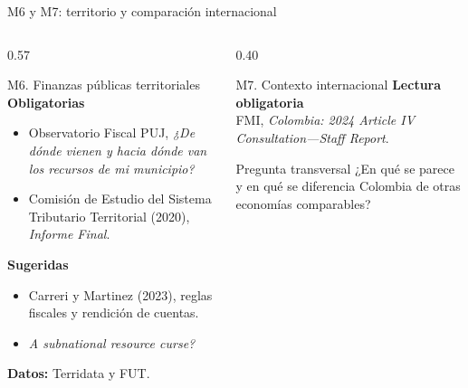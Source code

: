 \begin{frame}{M6 y M7: territorio y comparaci\'on internacional}
\scriptsize
\begin{columns}[T,onlytextwidth]
  \begin{column}{0.57\textwidth}
    \begin{block}{M6. Finanzas p\'ublicas territoriales}
      \textbf{Obligatorias}
      \begin{itemize}
        \item Observatorio Fiscal PUJ, \textit{¿De d\'onde vienen y hacia d\'onde van los recursos de mi municipio?}
        \item Comisi\'on de Estudio del Sistema Tributario Territorial (2020), \textit{Informe Final}.
      \end{itemize}
      \textbf{Sugeridas}
      \begin{itemize}
        \item Carreri y Martinez (2023), reglas fiscales y rendici\'on de cuentas.
        \item \textit{A subnational resource curse?}
      \end{itemize}
      \textbf{Datos:} Terridata y FUT.
    \end{block}
  \end{column}
  \begin{column}{0.40\textwidth}
    \begin{block}{M7. Contexto internacional}
      \textbf{Lectura obligatoria}\\[0.15cm]
      FMI, \textit{Colombia: 2024 Article IV Consultation---Staff Report}.
    \end{block}
    \begin{alertblock}{Pregunta transversal}
      ¿En qu\'e se parece y en qu\'e se diferencia Colombia de otras econom\'ias comparables?
    \end{alertblock}
  \end{column}
\end{columns}
\end{frame}

